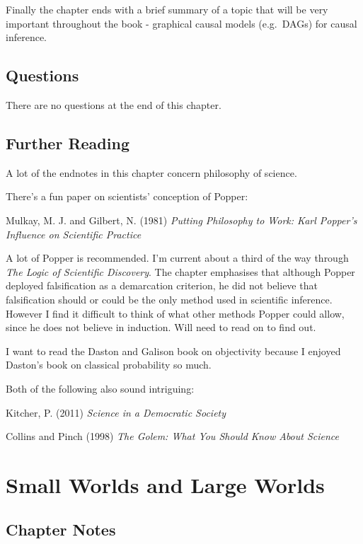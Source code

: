 \documentclass[
]{book}
\begin{document}
Finally the chapter ends with a brief summary of a topic that will be very important throughout the book - graphical causal models (e.g.~DAGs) for causal inference.

\hypertarget{questions}{%
\section{Questions}\label{questions}}

There are no questions at the end of this chapter.

\hypertarget{further-reading}{%
\section*{Further Reading}\label{further-reading}}

A lot of the endnotes in this chapter concern philosophy of science.

There's a fun paper on scientists' conception of Popper:

Mulkay, M. J. and Gilbert, N. (1981) \emph{Putting Philosophy to Work: Karl Popper's Influence on Scientific Practice}

A lot of Popper is recommended. I'm current about a third of the way through \emph{The Logic of Scientific Discovery}. The chapter emphasises that although Popper deployed falsification as a demarcation criterion, he did not believe that falsification should or could be the only method used in scientific inference. However I find it difficult to think of what other methods Popper could allow, since he does not believe in induction. Will need to read on to find out.

I want to read the Daston and Galison book on objectivity because I enjoyed Daston's book on classical probability so much.

Both of the following also sound intriguing:

Kitcher, P. (2011) \emph{Science in a Democratic Society}

Collins and Pinch (1998) \emph{The Golem: What You Should Know About Science}

\hypertarget{small_worlds}{%
\chapter{Small Worlds and Large Worlds}\label{small_worlds}}

\hypertarget{chapter-notes-1}{%
\section{Chapter Notes}\label{chapter-notes-1}}
\end{document}
